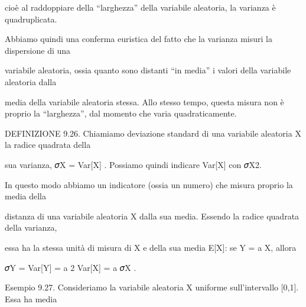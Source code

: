 \documentclass[a4paper,portrait,12pt]{article}
\begin{document}
\begin{flushleft}
cio\`{e} al raddoppiare della {``}larghezza'' della variabile aleatoria, la varianza \`{e} quadruplicata.
\end{flushleft}


\begin{flushleft}
Abbiamo quindi una conferma euristica del fatto che la varianza misuri la dispersione di una
\end{flushleft}


\begin{flushleft}
variabile aleatoria, ossia quanto sono distanti {``}in media'' i valori della variabile aleatoria dalla
\end{flushleft}


\begin{flushleft}
media della variabile aleatoria stessa. Allo stesso tempo, questa misura non \`{e} proprio la {``}larghezza'', dal momento che varia quadraticamente.
\end{flushleft}


\begin{flushleft}
DEFINIZIONE 9.26. Chiamiamo deviazione standard di una variabile aleatoria X la radice quadrata della
\end{flushleft}


\begin{flushleft}
sua varianza, 𝜎X = Var[X] . Possiamo quindi indicare Var[X] con 𝜎X2.
\end{flushleft}


\begin{flushleft}
In questo modo abbiamo un indicatore (ossia un numero) che misura proprio la media della
\end{flushleft}


\begin{flushleft}
distanza di una variabile aleatoria X dalla sua media. Essendo la radice quadrata della varianza,
\end{flushleft}


\begin{flushleft}
essa ha la stessa unit\`{a} di misura di X e della sua media E[X]: se Y = a X, allora
\end{flushleft}


\begin{flushleft}
𝜎Y = Var[Y] = a 2 Var[X] = a 𝜎X .
\end{flushleft}


\begin{flushleft}
Esempio 9.27. Consideriamo la variabile aleatoria X uniforme sull'intervallo [0,1]. Essa ha media
\end{flushleft}
\end{document}
